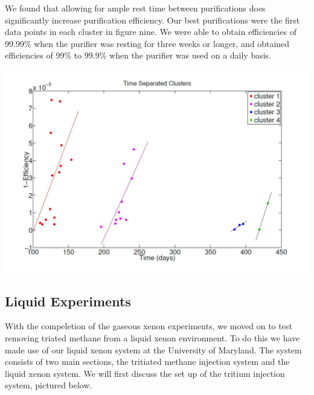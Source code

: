 \documentclass[a4paper,12pt]{article}
\begin{document}
We found that allowing for ample rest time between purifications does significantly increase purification efficiency. Our best purifications were the first data points in each cluster in figure nine.  We were able to obtain efficiencies of 99.99\% when the purifier was resting for three weeks or longer, and obtained efficiencies of 99\% to 99.9\% when the purifier was used on a daily basis.

\begin{center}
\includegraphics[scale=0.5]{Figfour.jpg}
\end{center}

\subsection{Liquid Experiments}

With the compeletion of the gaseous xenon experiments, we moved on to test removing triated methane from a liquid xenon environment.  To do this we have made use of our liquid xenon system at the University of Maryland.  The system consists of two main sections, the tritiated methane injection system and the liquid xenon system.  We will first discuss the set up of the tritium injection system, pictured below.
\end{document}
